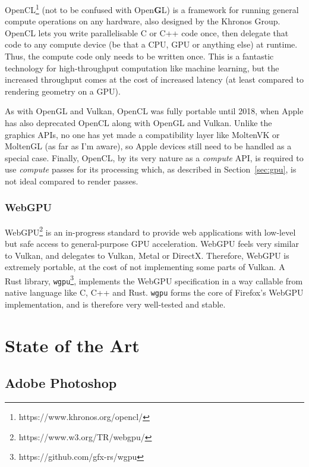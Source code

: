 \documentclass[12pt]{article}
\begin{document}
OpenCL\footnote{https://www.khronos.org/opencl/} (not to be confused with Open\textbf{G}L) is a
framework for running general compute operations on any hardware, also designed by the Khronos
Group.  OpenCL lets you write parallelisable C or C++ code once, then delegate that code to any
compute device (be that a CPU, GPU or anything else) at runtime.  Thus, the compute code only needs
to be written once.  This is a fantastic technology for high-throughput computation like machine
learning, but the increased throughput comes at the cost of increased latency (at least compared to
rendering geometry on a GPU).

As with OpenGL and Vulkan, OpenCL was fully portable until 2018, when Apple has also deprecated
OpenCL along with OpenGL and Vulkan.  Unlike the graphics APIs, no one has yet made a compatibility
layer like MoltenVK or MoltenGL (as far as I'm aware), so Apple devices still need to be handled as
a special case.  Finally, OpenCL, by its very nature as a \emph{compute} API, is required to use
\emph{compute} passes for its processing which, as described in Section~\ref{sec:gpu}, is not ideal
compared to render passes.

\subsubsection{WebGPU}\label{sec:wgpu}

WebGPU\footnote{https://www.w3.org/TR/webgpu/} is an in-progress standard to provide web
applications with low-level but safe access to general-purpose GPU acceleration.  WebGPU feels very
similar to Vulkan, and delegates to Vulkan, Metal or DirectX.  Therefore, WebGPU is extremely
portable, at the cost of not implementing some parts of Vulkan.  A Rust library,
\verb|wgpu|\footnote{https://github.com/gfx-rs/wgpu}, implements the WebGPU specification in a way
callable from native language like C, C++ and Rust.  \verb|wgpu| forms the core of Firefox's WebGPU
implementation, and is therefore very well-tested and stable.



\pagebreak

\section{State of the Art} %

\subsection{Adobe Photoshop}
\end{document}
